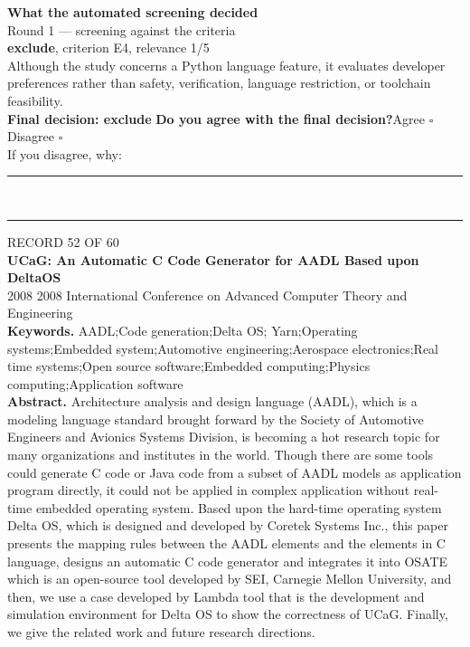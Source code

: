 \documentclass[11pt,a4paper]{article}
\begin{document}
\vspace{3mm}
\vspace{2.5mm}
{\small\textbf{What the automated screening decided}}\\[2mm]
{\footnotesize\color{soft}Round 1 --- screening against the criteria}\\[0.5mm]
{\small\textbf{exclude}, criterion E4, relevance 1/5}\\[0.5mm]
{\small Although the study concerns a Python language feature, it evaluates developer preferences rather than safety, verification, language restriction, or toolchain feasibility.}\\[2.5mm]
{\small\textbf{Final decision: exclude}}
\vspace{2mm}
{\small\textbf{Do you agree with the final decision?}\quad{}Agree $\square$\qquad{}Disagree $\square$}\\[1mm]
{\footnotesize\color{soft}If you disagree, why:}\\[1mm]
\color{rule}\rule{\linewidth}{0.3pt}\\[3mm]\rule{\linewidth}{0.3pt}\color{black}
\clearpage
{\color{soft}\footnotesize RECORD 52 OF 60}\\[1mm]
{\large\bfseries UCaG: An Automatic C Code Generator for AADL Based upon DeltaOS}\\[1.5mm]
{\color{soft}\small 2008 \textperiodcentered{} 2008 International Conference on Advanced Computer Theory and Engineering}\\[2mm]
{\small\textbf{Keywords.} AADL;Code generation;Delta OS; Yarn;Operating systems;Embedded system;Automotive engineering;Aerospace electronics;Real time systems;Open source software;Embedded computing;Physics computing;Application software}\\[2mm]
{\small\textbf{Abstract.} Architecture analysis and design language (AADL), which is a modeling language standard brought forward by the Society of Automotive Engineers and Avionics Systems Division, is becoming a hot research topic for many organizations and institutes in the world. Though there are some tools could generate C code or Java code from a subset of AADL models as application program directly, it could not be applied in complex application without real-time embedded operating system. Based upon the hard-time operating system Delta OS, which is designed and developed by Coretek Systems Inc., this paper presents the mapping rules between the AADL elements and the elements in C language, designs an automatic C code generator and integrates it into OSATE which is an open-source tool developed by SEI, Carnegie Mellon University, and then, we use a case developed by Lambda tool that is the development and simulation environment for Delta OS to show the correctness of UCaG. Finally, we give the related work and future research directions.}
\end{document}
